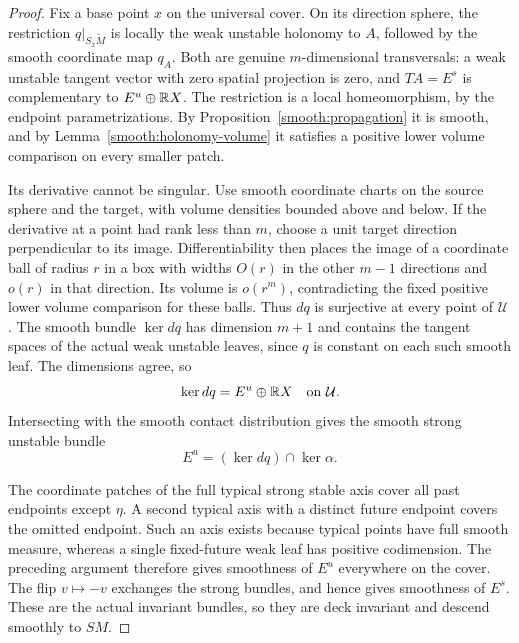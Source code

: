 \begin{proof}
Fix a base point $x$ on the universal cover.  On its direction sphere,
the restriction $q|_{S_x\widetilde M}$ is locally the weak unstable
holonomy to $A$, followed by the smooth coordinate map $q_A$.  Both are
genuine $m$-dimensional transversals: a weak unstable tangent vector
with zero spatial projection is zero, and $TA=E^s$ is complementary to
$E^u\oplus\mathbb R X$.  The restriction is a local
homeomorphism, by the endpoint parametrizations.  By
Proposition~\ref{smooth:propagation} it is smooth, and by
Lemma~\ref{smooth:holonomy-volume} it satisfies a positive lower volume
comparison on every smaller patch.

Its derivative cannot be singular. Use smooth coordinate charts on
the source sphere and the target, with volume densities bounded above
and below. If the derivative at a point had rank less than $m$, choose
a unit target direction perpendicular to its image. Differentiability
then places the image of a coordinate ball of radius $r$ in a box with
widths $O(r)$ in the other $m-1$ directions and $o(r)$ in that direction.
Its volume is $o(r^m)$, contradicting the fixed positive lower volume
comparison for these balls. Thus $dq$ is surjective at every point of
$\mathcal U$.  The smooth bundle $\ker dq$ has dimension $m+1$ and
contains the tangent spaces of the actual weak unstable leaves, since
$q$ is constant on each such smooth leaf.  The dimensions agree, so
\[
 \ker dq=E^u\oplus\mathbb R X
 \quad\hbox{on }\mathcal U.
\]
Intersecting with the smooth contact distribution gives the smooth
strong unstable bundle
\[
 E^u=(\ker dq)\cap\ker\alpha.
\]

The coordinate patches of the full typical strong stable axis cover
all past endpoints except $\eta$.  A second typical axis with a distinct
future endpoint covers the omitted endpoint.  Such an axis exists
because typical points have full smooth measure, whereas a single
fixed-future weak leaf has positive codimension.  The preceding
argument therefore gives smoothness of $E^u$ everywhere on the cover.
The flip $v\mapsto-v$ exchanges the strong bundles, and hence gives
smoothness of $E^s$.  These are the actual invariant bundles, so they
are deck invariant and descend smoothly to $SM$.
\end{proof}
